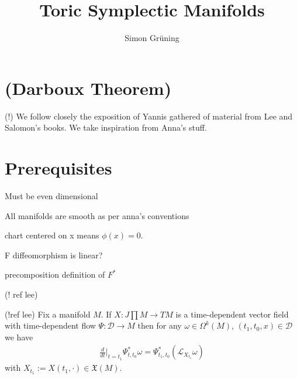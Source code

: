 


\title{Toric Symplectic Manifolds}
\author{Simon Gr\"uning}
\address[Simon Gr\"uning]{University of Zurich, R\"{a}mistrasse 71, 8006 Zurich}


\maketitle

\section*{(Darboux Theorem)}


\clearpage

(!) We follow closely the exposition of Yannis gathered of material from Lee and Salomon's books. We take inspiration from Anna's stuff.



\section{Prerequisites}

\begin{remark}
Must be even dimensional

All manifolds are smooth as per anna's conventions

chart centered on x means $\phi(x) = 0$.

F diffeomorphism is linear?

precomposition definition of $F^*$


\end{remark}

\begin{definition}
(! ref lee)

\end{definition}

\begin{proposition}
(!ref lee)
Fix a manifold $M$. If $X : J \prod M \to TM$ is a time-dependent vector field with time-dependent flow $\Psi: \mathcal{D} \to M$ then for any $\omega \in \Omega^k(M)$, $(t_1,t_0,x) \in \mathcal{D}$ we have
\begin{align*}
\frac{d}{dt} \bigg\vert_{t=t_1} \Psi^*_{t,t_0} \omega = \Psi^*_{t_1,t_0}(\mathcal{L}_{X_{t_1}} \omega)
\end{align*}
with $X_{t_1} := X(t_1, \cdot) \in \mathfrak{X}(M)$.
\end{proposition}

